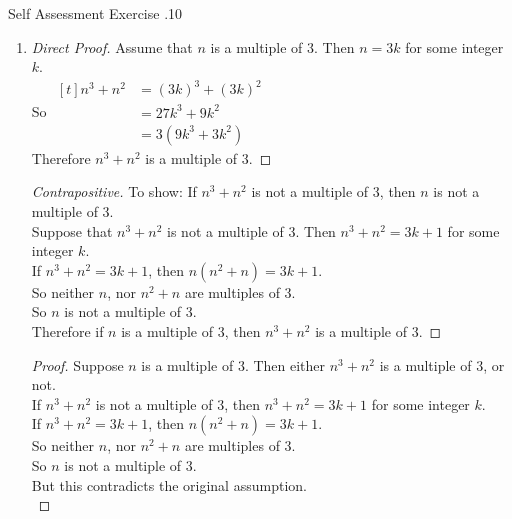 \documentclass[../notes.tex]{subfiles}
\begin{document}
\begin{exercise}{Self Assessment Exercise \thechapter.10}
\begin{enumerate}
\begin{enumerate}[label=(\alph*)]
\begin{proof}[Contradiction]
										So $x$ is odd.\\
										But this contradicts the original assumption, so it must be the case that $x^{2} + 4x + 2$ is even.
									\end{proof}
								\item {}
									\begin{proof}[Direct Proof]
										Assume that $n$ is a multiple of $3$. Then $n = 3k$ for some integer $k$.\\
										So $\begin{aligned}[t]
											n^{3} + n^{2} &= (3k)^{3} + (3k)^{2}\\
											&= 27k^{3} + 9k^{2}\\
											&= 3(9k^{3} + 3k^{2})
										\end{aligned} $\\
										Therefore $n^{3} + n^{2}$ is a multiple of $3$.
									\end{proof}
									\begin{proof}[Contrapositive]
										To show: If $n^{3} + n^{2}$ is not a multiple of $3$, then $n$ is not a multiple of $3$.\\
										Suppose that $n^{3} + n^{2}$ is not a multiple of $3$. Then $n^{3} + n^{2} = 3k + 1$ for some integer $k$.\\
										If $n^{3} + n^{2} = 3k + 1$, then $n(n^{2} + n) = 3k + 1$.\\
										So neither $n$, nor $n^{2} + n$ are multiples of $3$.\\
										So $n$ is not a multiple of $3$.\\
										Therefore if $n$ is a multiple of $3$, then $n^{3} + n^{2}$ is a multiple of $3$.
									\end{proof}
									\begin{proof}
										Suppose $n$ is a multiple of $3$. Then either $n^{3} + n^{2}$ is a multiple of $3$, or not.\\
										If $n^{3} + n^{2}$ is not a multiple of $3$, then $n^{3} + n^{2} = 3k + 1$ for some integer $k$.\\
										If $n^{3} + n^{2} = 3k + 1$, then $n(n^{2} + n) = 3k + 1$.\\
										So neither $n$, nor $n^{2} + n$ are multiples of $3$.\\
										So $n$ is not a multiple of $3$.\\
										But this contradicts the original assumption.\\

\end{proof}
\end{enumerate}
\end{enumerate}
\end{exercise}
\end{document}
